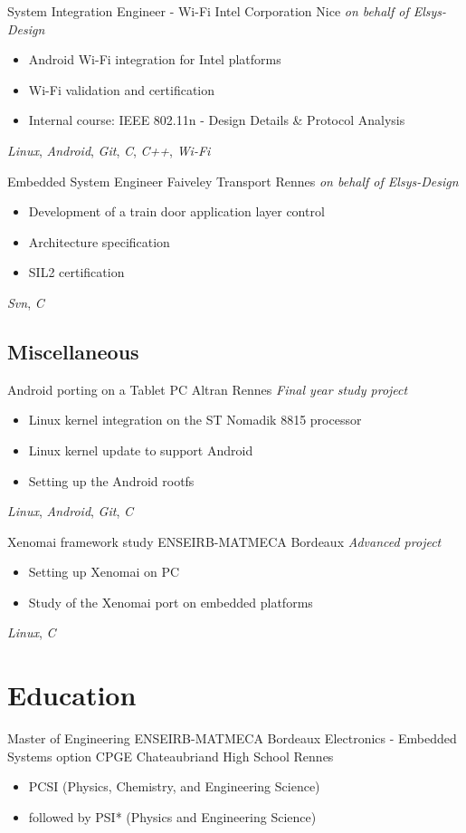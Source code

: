 \documentclass[11pt,a4paper,sans]{moderncv}
\begin{document}
	{System Integration Engineer - Wi-Fi}
	{Intel Corporation}
	{Nice}
	{\textit{on behalf of Elsys-Design}}
	{
		\begin{itemize}
		\item Android Wi-Fi integration for Intel platforms
		\item Wi-Fi validation and certification
		\item Internal course: IEEE 802.11n
			- Design Details \& Protocol Analysis
		\end{itemize}
		\textit{Linux}, \textit{Android},
		\textit{Git},
		\textit{C}, \textit{C++},
		\textit{Wi-Fi}
	}
	{Embedded System Engineer}
	{Faiveley Transport}
	{Rennes}
	{\textit{on behalf of Elsys-Design}}
	{
		\begin{itemize}
		\item Development of a train door application layer control
		\item Architecture specification
		\item SIL2 certification
		\end{itemize}
		\textit{Svn},
		\textit{C}
	}

\subsection{Miscellaneous}
	{Android porting on a Tablet PC}
	{Altran}
	{Rennes}
	{\textit{Final year study project}}
	{
		\begin{itemize}
		\item Linux kernel integration on the ST Nomadik 8815 processor
		\item Linux kernel update to support Android
		\item Setting up the Android rootfs
		\end{itemize}
		\textit{Linux}, \textit{Android},
		\textit{Git},
		\textit{C}
	}
	{Xenomai framework study}
	{ENSEIRB-MATMECA}
	{Bordeaux}
	{\textit{Advanced project}}
	{
		\begin{itemize}
		\item Setting up Xenomai on PC
		\item Study of the Xenomai port on embedded platforms
		\end{itemize}
		\textit{Linux}, \textit{C}
	}

\clearpage

\section{Education}
	{Master of Engineering}
	{ENSEIRB-MATMECA}
	{Bordeaux}
	{}
	{Electronics - Embedded Systems option}
	{CPGE}
	{Chateaubriand High School}
	{Rennes}
	{}
	{
		\begin{itemize}
		\item PCSI (Physics, Chemistry, and Engineering Science)
		\item followed by PSI* (Physics and Engineering Science)
		\end{itemize}
	}
\end{document}
